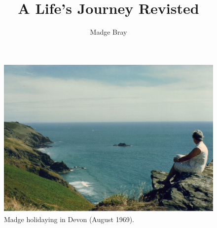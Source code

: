 \documentclass[12pt, a4paper, twoside]{book} %
\begin{document}
\frontmatter %
    \title{A Life's Journey Revisted}
    \author{Madge Bray}
    \maketitle

    \clearpage
    \thispagestyle{empty} %
    \phantom{a}
    \clearpage

    \thispagestyle{empty}
    \begin{figure}
      \includegraphics[width=\textwidth]{photos/madge-by-sea.jpg}
      \caption{Madge holidaying in Devon (August 1969).}
      \label{madge-by-sea}
    \end{figure}

    \clearpage
    \thispagestyle{empty}

    \tableofcontents
    \setcounter{page}{1}
    \clearpage
    \thispagestyle{empty}


    
    


\mainmatter  %
    


\appendix
    
    

\backmatter
\end{document}
